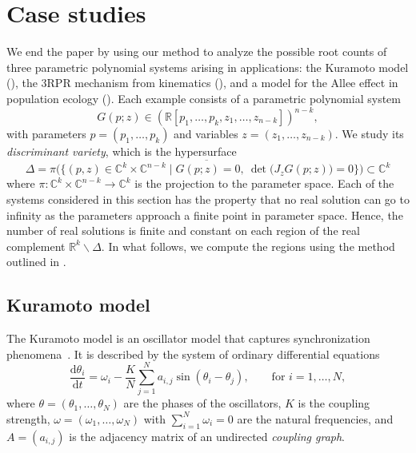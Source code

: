 \documentclass[11pt]{article}
\numberwithin{equation}{section}
\theoremstyle{plain}
\theoremstyle{definition}
\theoremstyle{remark}
\newcommand\bC{{\mathbb C}}
\newcommand\bR{{\mathbb R}}
\begin{document}
\section{Case studies}
\label{sec:examples}
We end the paper by using our method to analyze the possible root counts of three parametric polynomial systems arising in applications: the Kuramoto model (), the 3RPR mechanism from kinematics (), and
a model for the Allee effect in population ecology ().
Each example consists of a parametric polynomial system 
\begin{equation*}
    G(p;z) \in (\bR[p_{1},\dots,p_{k}, z_{1},\dots,z_{n-k}])^{n-k},
\end{equation*}
with parameters $p=(p_1,\ldots,p_k)$ and variables $z=(z_1,\ldots,z_{n-k})$. We study its \emph{discriminant variety}, which is the hypersurface
\begin{equation}
\label{eq:discriminant}
    \Delta = \overline{\pi\bigl(\bigl\{(p,z) \in \bC^{k}\times \bC^{n-k} \mid G(p;z) = 0,\: \det\bigl(J_zG(p;z)\bigr) = 0\bigr\}\bigr)}
\subset \bC^{k}
\end{equation}
where $\pi\colon \bC^{k}\times \bC^{n-k} \to \bC^{k}$ is the projection to the parameter space.  
Each of the systems considered in this section has the property that no real solution can go to infinity as the parameters approach a finite point in parameter space. Hence, the number of real solutions is finite and constant on each region of the real complement $\bR^{k}\smallsetminus \Delta$. In what follows, we compute the regions using the method outlined in . 

\subsection{Kuramoto model}\label{subsec:kuramoto}

The Kuramoto model is an oscillator model that captures synchronization phenomena~\cite{Kuramoto,Kuramoto:1975ebm,Kuramoto-chemical}. It is described by the system of ordinary differential equations
\begin{equation}\label{eq:kuramoto-ode}
    \frac{\mathrm d\theta_{i}}{\mathrm dt} = \omega_{i} - \frac{K}{N}\sum\limits_{j=1}^{N}a_{i,j}\sin(\theta_{i} - \theta_{j}), \qquad \text{for } i=1,\dots,N,
\end{equation}
where $\theta=(\theta_1,\ldots,\theta_N)$ are the phases of the oscillators, $K$ is the coupling strength, $\omega = (\omega_{1},\dots,\omega_{N})$ with $\sum_{i=1}^N\omega_i=0$ are the natural frequencies, and $A=(a_{i,j})$ is the adjacency matrix of an undirected \emph{coupling graph}. 
\end{document}
